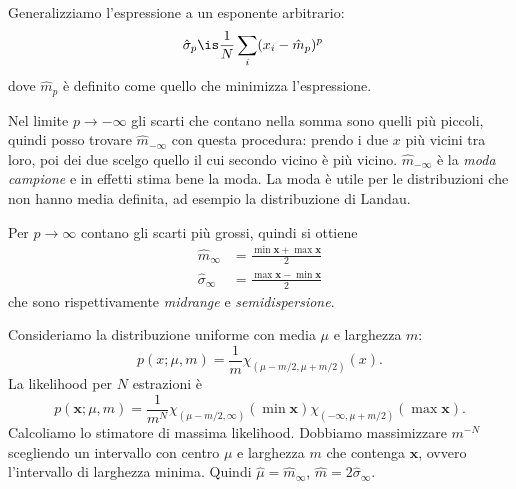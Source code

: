 Generalizziamo l'espressione a un esponente arbitrario:
\begin{align*}
	\hat\sigma_p
	&\is \frac1N \sum_i (x_i - \hat m_p)^p
\end{align*}
dove $\hat m_p$ è definito come quello che minimizza l'espressione.

Nel limite $p\to-\infty$ gli scarti che contano nella somma sono quelli più piccoli,
quindi posso trovare $\hat m_{-\infty}$ con questa procedura:
prendo i due $x$ più vicini tra loro, poi dei due scelgo quello il cui secondo vicino è più vicino.
$\hat m_{-\infty}$ è la \emph{moda campione} e in effetti stima bene la moda.
La moda è utile per le distribuzioni che non hanno media definita,
ad esempio la distribuzione di Landau.

Per $p\to\infty$ contano gli scarti più grossi,
quindi si ottiene
\begin{align*}
	\hat m_\infty
	&= \frac{\min\mathbf x + \max\mathbf x}2 \\
	\hat\sigma_\infty
	&= \frac{\max\mathbf x - \min\mathbf x}2
\end{align*}
che sono rispettivamente \emph{midrange} e \emph{semidispersione}.
\begin{example}
	Consideriamo la distribuzione uniforme con media $\mu$ e larghezza $m$:
	\begin{equation*}
		p(x;\mu,m)
		= \frac1m \chi_{(\mu-m/2,\mu+m/2)}(x).
	\end{equation*}
	La likelihood per $N$ estrazioni è
	\begin{equation*}
		p(\mathbf x;\mu,m)
		= \frac1{m^N} \chi_{(\mu-m/2,\infty)}(\min\mathbf x) \chi_{(-\infty,\mu+m/2)}(\max\mathbf x).
	\end{equation*}
	Calcoliamo lo stimatore di massima likelihood.
	Dobbiamo massimizzare $m^{-N}$ scegliendo un intervallo con centro $\mu$ e larghezza $m$ che contenga $\mathbf x$,
	ovvero l'intervallo di larghezza minima.
	Quindi $\hat\mu=\hat m_\infty$, $\hat m=2\hat\sigma_\infty$.
\end{example}

